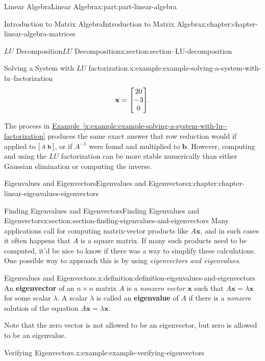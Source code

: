 \documentclass[twoside,10pt,]{book}
\newcommand{\xreffont}{\relax}
\newcommand{\terminology}[1]{\textbf{#1}}
\numberwithin{equation}{part}
\providecommand{\vb}[1]{\mathbf{#1}}
\begin{document}
\begin{partptx}{Linear Algebra}{}{Linear Algebra}{}{}{x:part:part-linear-algebra}
\begin{chapterptx}{Introduction to Matrix Algebra}{}{Introduction to Matrix Algebra}{}{}{x:chapter:chapter-linear-algebra-matrices}
\begin{sectionptx}{\(LU\) Decomposition}{}{\(LU\) Decomposition}{}{}{x:section:section--LU-decomposition}
\begin{example}{Solving a System with \(LU\) factorization.}{x:example:example-solving-a-system-with-lu--factorization}
\begin{equation*}
\vb{x} = \mqty[20\\-3\\0].
\end{equation*}
%
\end{example}
The process in \hyperref[x:example:example-solving-a-system-with-lu--factorization]{Example~{\xreffont\ref{x:example:example-solving-a-system-with-lu--factorization}}} produces the same exact answer that row reduction would if applied to \(\smqty[A & \vb{b}]\), or if \(A^{-1}\) were found and multiplied to \(\vb{b}\). However, computing and using the \(LU\) factorization can be more stable numerically than either Gaussian elimination or computing the inverse.%
\end{sectionptx}
\end{chapterptx}
%
\typeout{************************************************}
\typeout{************************************************}
%
\begin{chapterptx}{Eigenvalues and Eigenvectors}{}{Eigenvalues and Eigenvectors}{}{}{x:chapter:chapter-linear-eigenvalues-eigenvectors}
%
%
\typeout{************************************************}
\typeout{************************************************}
%
\begin{sectionptx}{Finding Eigenvalues and Eigenvectors}{}{Finding Eigenvalues and Eigenvectors}{}{}{x:section:section-finding-eigenvalues-and-eigenvectors}
Many applications call for computing matrix-vector products like \(A\vb{x}\), and in such cases it often happens that \(A\) is a square matrix. If many such products need to be computed, it'd be nice to know if there was a way to simplify these calculations. One possible way to approach this is by using \emph{eigenvectors and eigenvalues}.%
\begin{definition}{Eigenvalues and Eigenvectors.}{x:definition:definition-eigenvalues-and-eigenvectors}%
%
An \terminology{eigenvector} of an \(n\times n\) matrix \(A\) is a \emph{nonzero vector} \(\vb{x}\) such that \(A\vb{x} = \lambda\vb{x}\) for some scalar \(\lambda\). A scalar \(\lambda\) is called an \terminology{eigenvalue} of \(A\) if there is a \emph{nonzero} solution of the equation \(A\vb{x} = \lambda\vb{x}\).%
\end{definition}
Note that the zero vector is not allowed to be an eigenvector, but zero is allowed to be an eigenvalue.%
\begin{example}{Verifying Eigenvectors.}{x:example:example-verifying-eigenvectors}%

\end{example}
\end{sectionptx}
\end{chapterptx}
\end{partptx}
\end{document}

